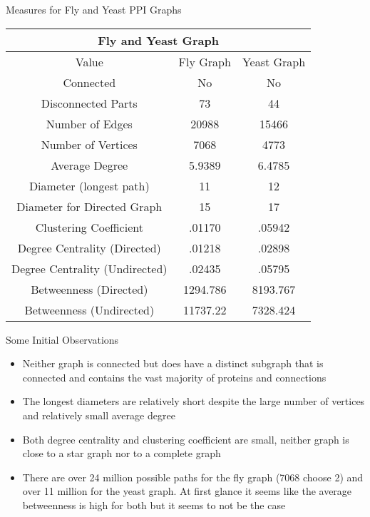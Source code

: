 \documentclass[xcolor=table]{beamer}
\begin{document}
\begin{frame}{Measures for Fly and Yeast PPI Graphs}
    \begin{table}[H]
\begin{center}
\begin{tabular}{ |c|c|c|  }

\hline
\multicolumn{3}{|c|}{Fly and Yeast Graph} \\
\hline
\rowcolor{gray!50}
Value & Fly Graph &Yeast Graph \\
\hline
Connected &No &No\\
Disconnected Parts & 73 & 44 \\
Number of Edges &20988 & 15466\\
Number of Vertices & 7068 & 4773\\
Average Degree & 5.9389   & 6.4785 \\
Diameter (longest path) & 11 & 12 \\
Diameter for Directed Graph & 15&17 \\
Clustering Coefficient  & .01170 & .05942 \\
Degree Centrality (Directed) & .01218 &  .02898 \\
Degree Centrality (Undirected) & .02435 &  .05795 \\

Betweenness (Directed)&  1294.786 & 8193.767   \\
Betweenness (Undirected)&  11737.22 & 7328.424   \\

\hline
\end{tabular}
\end{center}
\end{table}
\end{frame}

\begin{frame}{Some Initial Observations}
    \begin{itemize}
        \item Neither graph is connected but does have a distinct subgraph that is connected and contains the vast majority of proteins and connections
        \item The longest diameters are relatively short despite the large number of vertices and relatively small average degree
        \item Both degree centrality and clustering coefficient are small, neither graph is close to a star graph nor to a complete graph
        \item There are over 24 million possible paths for the fly graph (7068 choose 2) and over 11 million for the yeast graph. At first glance it seems like the average betweenness is high for both but it seems to not be the case
    \end{itemize}
\end{frame}
\end{document}
